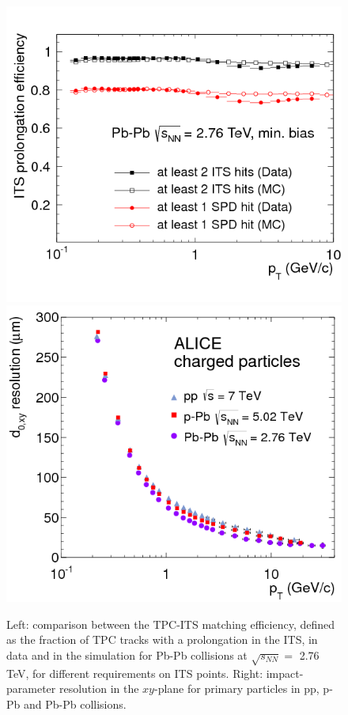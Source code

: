 \documentclass[b5paper,10pt,twoside,oldstyle,classica]{toptesi}
\begin{document}
\begin{figure}[tb]
\begin{center}
{\includegraphics[scale = 0.3]{06-tracking_ITS_TPC_trackingEff_PbPb.png}}
\hspace{0cm}
{\includegraphics[scale = 0.3]{06-tracking_d0rphi_res_pp_pPb_PbPb_dataonly.png}}
\caption{Left: comparison between the TPC-ITS matching efficiency, defined as the fraction of TPC tracks with a prolongation in the ITS, in data and in the simulation for Pb-Pb collisions at $\sqrt{s_{NN}} =$ 2.76 TeV, for different requirements on ITS points. Right: impact-parameter resolution in the $xy$-plane for primary particles in pp, p-Pb and Pb-Pb collisions.}

\end{center}
\end{figure}
\end{document}
